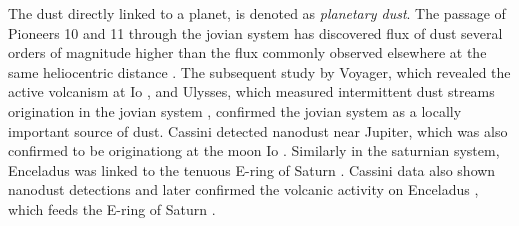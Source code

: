 The dust directly linked to a planet, is denoted as \textit{planetary dust}. The passage of Pioneers 10 and 11 through the jovian system has discovered flux of dust several orders of magnitude higher than the flux commonly observed elsewhere at the same heliocentric distance \citep{humes1974interplanetary}. The subsequent study by Voyager, which revealed the active volcanism at Io \citep{kruger2004jovian}, and Ulysses, which measured intermittent dust streams origination in the jovian system \citep{grun1993discovery}, confirmed the jovian system as a locally important source of dust. Cassini detected nanodust near Jupiter, which was also confirmed to be originationg at the moon Io \citep{meyer2009detecting}. Similarly in the saturnian system, Enceladus was linked to the tenuous E-ring of Saturn \citep{baum1981saturn}. Cassini data also shown nanodust detections \citep{kempf2005high} and later confirmed the volcanic activity on Enceladus \citep{spahn2006cassini}, which feeds the E-ring of Saturn \citep{kempf2010enceladus}. 

